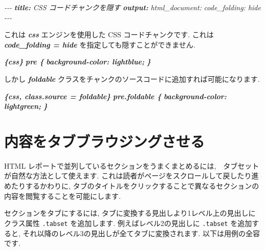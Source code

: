 \documentclass[
  11pt,
  lualatex,ja=standard,jafont=noto]{bxjsreport}
\newenvironment{Shaded}{\begin{snugshade}}{\end{snugshade}}
\newcommand{\AnnotationTok}[1]{\textcolor[rgb]{0.56,0.35,0.01}{\textbf{\textit{#1}}}}
\newcommand{\CommentTok}[1]{\textcolor[rgb]{0.56,0.35,0.01}{\textit{#1}}}
\newcommand{\InformationTok}[1]{\textcolor[rgb]{0.56,0.35,0.01}{\textbf{\textit{#1}}}}
\newcommand{\NormalTok}[1]{#1}
\begin{document}
\begin{Shaded}
\begin{Highlighting}[]
\CommentTok{{-}{-}{-}}
\AnnotationTok{title:}\CommentTok{ CSS コードチャンクを隠す}
\AnnotationTok{output:}\CommentTok{ }
\CommentTok{  html\_document:}
\CommentTok{    code\_folding: hide}
\CommentTok{{-}{-}{-}}

\NormalTok{これは }\InformationTok{\textasciigrave{}css\textasciigrave{}}\NormalTok{ エンジンを使用した CSS コードチャンクです. これは }\InformationTok{\textasciigrave{}code\_folding = \textquotesingle{}hide\textquotesingle{}\textasciigrave{}}\NormalTok{ を指定しても隠すことができません.}

\InformationTok{\textasciigrave{}\textasciigrave{}\textasciigrave{}\{css\}}
\InformationTok{pre \{}
\InformationTok{  background{-}color: lightblue;}
\InformationTok{\}}
\InformationTok{\textasciigrave{}\textasciigrave{}\textasciigrave{}}

\NormalTok{しかし }\InformationTok{\textasciigrave{}foldable\textasciigrave{}}\NormalTok{ クラスをチャンクのソースコードに追加すれば可能になります.}

\InformationTok{\textasciigrave{}\textasciigrave{}\textasciigrave{}\{css, class.source = \textquotesingle{}foldable\textquotesingle{}\}}
\InformationTok{pre.foldable \{}
\InformationTok{  background{-}color: lightgreen;}
\InformationTok{\}}
\InformationTok{\textasciigrave{}\textasciigrave{}\textasciigrave{}}
\end{Highlighting}
\end{Shaded}

\hypertarget{html-tabs}{%
\section{内容をタブブラウジングさせる}\label{html-tabs}}

HTML レポートで並列しているセクションをうまくまとめるには,　タブセットが自然な方法として使えます. これは読者がページをスクロールして戻したり進めたりするかわりに, タブのタイトルをクリックすることで異なるセクションの内容を閲覧することを可能にします.

セクションをタブにするには, タブに変換する見出しより1レベル上の見出しにクラス属性 \texttt{.tabset} を追加します. 例えばレベル2の見出しに \texttt{.tabset} を追加すると, それ以降のレベル3の見出しが全てタブに変換されます. 以下は用例の全容です.
\end{document}

